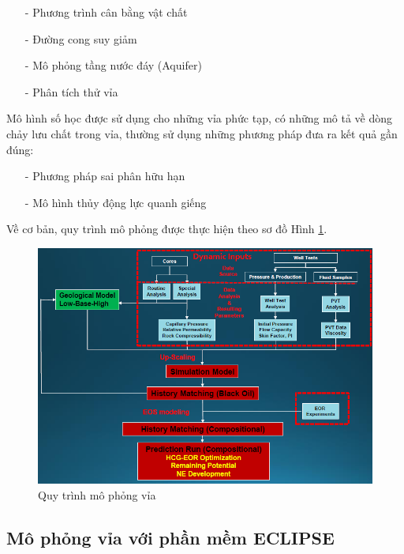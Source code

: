 \documentclass[12pt,a4paper]{report}
\begin{document}
	\begin{itemize}
    	\item[-] Phương trình cân bằng vật chất
        \item[-] Đường cong suy giảm
        \item[-] Mô phỏng tầng nước đáy (Aquifer)
        \item[-] Phân tích thử vỉa
    \end{itemize}
Mô hình số học được sử dụng cho những vỉa phức tạp, có những mô tả về dòng chảy lưu chất trong vỉa, thường sử dụng những phương pháp đưa ra kết quả gần đúng:
	\begin{itemize}
    	\item[-] Phương pháp sai phân hữu hạn
        \item[-] Mô hình thủy động lực quanh giếng
    \end{itemize}

Về cơ bản, quy trình mô phỏng được thực hiện theo sơ đồ Hình \ref{fig:workflow}.
	\begin{figure}[h]
    	\centering
        \includegraphics[scale=.7]{Fig/model_workflow.PNG}
        \caption{Quy trình mô phỏng vỉa}
        \label{fig:workflow}
    \end{figure}
\subsection{Mô phỏng vỉa với phần mềm ECLIPSE}
\end{document}
